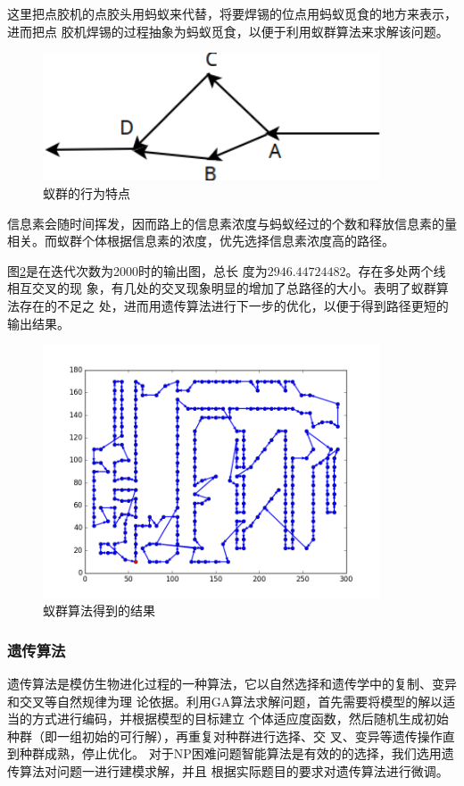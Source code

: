 \documentclass[fontset=windows,a4paper,12pt]{ctexart}
\begin{document}
		   这里把点胶机的点胶头用蚂蚁来代替，将要焊锡的位点用蚂蚁觅食的地方来表示，进而把点
		   胶机焊锡的过程抽象为蚂蚁觅食，以便于利用蚁群算法来求解该问题。
    	   \begin{figure}[htbp]
    	   	\centering
    	   	\includegraphics[width=10cm]{pic/anti1.png}
    	   	\caption{蚁群的行为特点}
    	   	\label{fig:anti1}
    	   \end{figure}		   

			信息素会随时间挥发，因而路上的信息素浓度与蚂蚁经过的个数和释放信息素的量
			相关。而蚁群个体根据信息素的浓度，优先选择信息素浓度高的路径。
			
		   图\ref{fig:anti}是在迭代次数为2000时的输出图，总长
		   度为$2946.44724482$。存在多处两个线相互交叉的现
		   象，有几处的交叉现象明显的增加了总路径的大小。表明了蚁群算法存在的不足之
		   处，进而用遗传算法进行下一步的优化，以便于得到路径更短的输出结果。			
    	   \begin{figure}[htbp]
    	   	 \centering
    	   	 \includegraphics[width=10cm]{pic/anti_result.png}
    	   	 \caption{蚁群算法得到的结果}
    	   	 \label{fig:anti}
    	   \end{figure}

      \subsubsection{遗传算法}
      
      遗传算法是模仿生物进化过程的一种算法，它以自然选择和遗传学中的复制、变异和交叉等自然规律为理
      论依据。利用GA算法求解问题，首先需要将模型的解以适当的方式进行编码，并根据模型的目标建立
      个体适应度函数，然后随机生成初始种群（即一组初始的可行解），再重复对种群进行选择、交
      叉、变异等遗传操作直到种群成熟，停止优化\cite{赵静2008数学建模与数学实验}。
      对于NP困难问题智能算法是有效的的选择，我们选用遗传算法对问题一进行建模求解，并且
      根据实际题目的要求对遗传算法进行微调。
        
\end{document}
